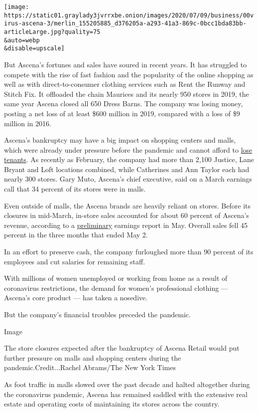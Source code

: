 \texttt{[image: https://static01.graylady3jvrrxbe.onion/images/2020/07/09/business/00virus-ascena-3/merlin\_155205885\_d376205a-a293-41a3-869c-0bcc1bda83bb-articleLarge.jpg?quality=75\\\&auto=webp\\\&disable=upscale]}

But Ascena's fortunes and sales have soured in recent years. It has
struggled to compete with the rise of fast fashion and the popularity of
the online shopping as well as with direct-to-consumer clothing services
such as Rent the Runway and Stitch Fix. It offloaded the chain Maurices
and its nearly 950 stores in 2019, the same year Ascena closed all 650
Dress Barns. The company was losing money, posting a net loss of at
least \$600 million in 2019, compared with a loss of \$9 million in
2016.

Ascena's bankruptcy may have a big impact on shopping centers and malls,
which were already under pressure before the pandemic and cannot afford
to
\href{https://www.nytimes3xbfgragh.onion/2020/07/05/business/coronavirus-malls-department-stores-bankruptcy.html}{lose
tenants}. As recently as February, the company had more than 2,100
Justice, Lane Bryant and Loft locations combined, while Catherines and
Ann Taylor each had nearly 300 stores. Gary Muto, Ascena's chief
executive, said on a March earnings call that 34 percent of its stores
were in malls.

Even outside of malls, the Ascena brands are heavily reliant on stores.
Before its closures in mid-March, in-store sales accounted for about 60
percent of Ascena's revenue, according to a
\href{https://ascenaretailgroupinc.gcs-web.com/node/14181/pdf}{preliminary}
earnings report in May. Overall sales fell 45 percent in the three
months that ended May 2.

In an effort to preserve cash, the company furloughed more than 90
percent of its employees and cut salaries for remaining staff.

With millions of women unemployed or working from home as a result of
coronavirus restrictions, the demand for women's professional clothing
--- Ascena's core product --- has taken a nosedive.

But the company's financial troubles preceded the pandemic.

Image

The store closures expected after the bankruptcy of Ascena Retail would
put further pressure on malls and shopping centers during the
pandemic.Credit...Rachel Abrams/The New York Times

As foot traffic in malls slowed over the past decade and halted
altogether during the coronavirus pandemic, Ascena has remained saddled
with the extensive real estate and operating costs of maintaining its
stores across the country.


